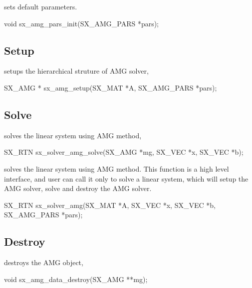  sets default parameters.
\begin{evb}
void sx_amg_pars_init(SX_AMG_PARS *pars);
\end{evb}

\subsection{Setup}
 setups the hierarchical struture of AMG solver,
\begin{evb}
SX_AMG * sx_amg_setup(SX_MAT *A, SX_AMG_PARS *pars);
\end{evb}

\subsection{Solve}

 solves the linear system using AMG method,
\begin{evb}
SX_RTN sx_solver_amg_solve(SX_AMG *mg, SX_VEC *x, SX_VEC *b);
\end{evb}

 solves the linear system using AMG method. This function is a high level 
interface, and user can call it only to solve a linear system, which will setup the AMG solver,
solve and destroy the AMG solver.
\begin{evb}
SX_RTN sx_solver_amg(SX_MAT *A, SX_VEC *x, SX_VEC *b, SX_AMG_PARS *pars);
\end{evb}

\subsection{Destroy}
 destroys the AMG object,
\begin{evb}
void sx_amg_data_destroy(SX_AMG **mg);
\end{evb}

